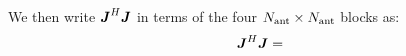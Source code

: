 \documentclass[useAMS,usenatbib]{mn2e}
\makeatletter
\newcommand{\mat}[1]{{\bmath{#1}}}
\newcommand{\JJ}{\mat{J}} %
\newcommand{\Matrix}[2]{\left [ \begin{array}{@{}#1@{}}#2\end{array} \right ]}
\numberwithin{equation}{section}
\makeatother
\begin{document}
\newcommand{\JHJblocksFull}[4]{
\Matrix{c@{}c@{}c}{
 #1 & \bigg |~ & #2 \\[10pt]
 \hline \\[-8pt]
 #3 & \bigg |~ & #4 }
}

\newcommand{\JHJblocks}[2]{
\Matrix{c@{}c@{}c}{
 #1 & \big |~ & \nearrow^H \\
 \hline \\[-8pt]
 #2 & \bigg |~ & \searrow~~ }
}

We then write $\JJ^H\JJ$ in terms of the four $N_\mathrm{ant}\times N_\mathrm{ant}$ blocks as:
\begin{equation}
\label{eq:JHJ:DI}
\JJ^H \JJ = 
\end{equation}%

\end{document}
